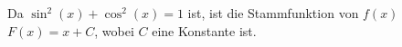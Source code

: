 Da $\sin^2(x) + \cos^2(x) = 1$ ist, ist die Stammfunktion von $f(x)$ $F(x) = x + C$, wobei $C$ eine Konstante ist.

